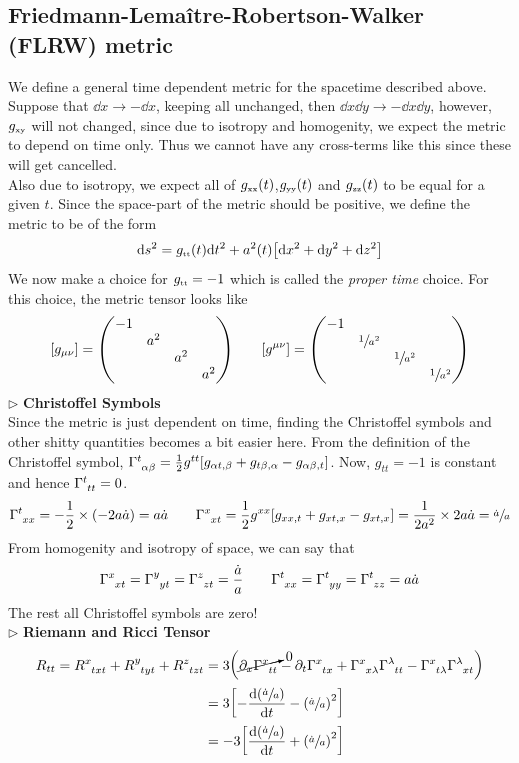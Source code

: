 \subsection{Friedmann-Lema\^{i}tre-Robertson-Walker (FLRW) metric}
We define a general time dependent metric for the spacetime described above. Suppose that $\dd x \rightarrow -\dd x$, keeping all unchanged, then $\dd x \dd y \rightarrow -\dd x \dd y $, however, $g_{\text{\tiny xy}}$ will not changed, since due to isotropy and homogenity, we expect the metric to depend on time only. Thus we cannot have any cross-terms like this since these will get cancelled. \\[0.2cm]
Also due to isotropy, we expect all of $g_{\text{\tiny xx}}(t) $,$g_{\text{\tiny yy}}(t) $ and $g_{\text{\tiny zz}}(t) $ to be equal for a given $t$. Since the space-part of the metric should be positive, we define the metric to be of the form 
$$\dd s^2 = g_{\text{\tiny tt}}(t) \dd t^2 + a^2(t)\qty[\dd x^2 + \dd y^2 + \dd z^2]$$
We now make a choice for $g_{\text{\tiny tt}}= -1$ which is called the \textit{proper time} choice. For this choice, the metric tensor looks like 
$$[g_{\mu\nu}] = \mqty(-1 & & & \\ & a^2 & & \\ & & a^2 & \\ & & & a^2 )\qquad [g^{\mu\nu}] = \mqty(-1 & & & \\ & \sfrac{1}{a^2} & & \\ & & \sfrac{1}{a^2} & \\ & & & \sfrac{1}{a^2} )$$
$\triangleright$ \textbf{Christoffel Symbols}\\[0.2cm]
Since the metric is just dependent on time, finding the Christoffel symbols and other shitty quantities becomes a bit easier here. From the definition of the Christoffel symbol,
$ \chris{t}{\alpha}{\beta} = \frac{1}{2}g^{tt}\qty[g_{\alpha t,\beta}+ g_{t\beta,\alpha}- g_{\alpha\beta,t}]$. Now, 
$g_{tt} = -1$ is constant and hence $\chris{t}{t}{t} =0$.\\[0.2cm]
$$\chris{t}{x}{x} = -\frac{1}{2}\times\qty(-2a \dot{a})= a\dot{a}\qquad \chris{x}{x}{t} = \frac{1}{2}g^{xx}\qty[g_{x x,t} + g_{x t,x} - g_{xt, x}] = \frac{1}{2a^2} \times 2a \dot{a} =\sfrac{\dot{a}}{a}$$ From homogenity and isotropy of space, we can say that $$\chris{x}{x}{t}=\chris{y}{y}{t}=\chris{z}{z}{t} = \frac{\dot{a}}{a}\qquad \chris{t}{x}{x} =\chris{t}{y}{y}=\chris{t}{z}{z} = a\dot{a}$$ The rest all Christoffel symbols are zero! \\[0.2cm]
$\triangleright$ \textbf{Riemann and Ricci Tensor}
\begin{align*}
    R_{tt}=\rie{x}{t}{x}{t}+\rie{y}{t}{y}{t}+\rie{z}{t}{z}{t} &= 3\qty(\cancelto{0}{\partial_x \chris{x}{t}{t}} -\partial_t \chris{x}{t}{x}+\chris{x}{x}{\lambda}\chris{\lambda}{t}{t}-\chris{x}{t}{\lambda}\chris{\lambda}{x}{t}  )\\
    &=3\qty[ - \dv{\qty(\sfrac{\dot{a}}{a})}{t} - \qty(\sfrac{\dot{a}}{a})^2]\\
    &=-3\qty[  \dv{\qty(\sfrac{\dot{a}}{a})}{t} + \qty(\sfrac{\dot{a}}{a})^2]
\end{align*}
